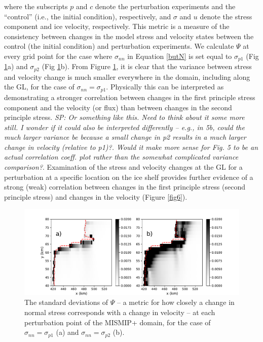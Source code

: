 \documentclass[review,oneside]{igs}
\begin{document}
where the subscripts $p$ and $c$ denote the perturbation experiments and the ``control'' (i.e., the initial condition), respectively, and $\sigma$ and $u$ denote the stress component and ice velocity, respectively. This metric is a measure of the consistency between changes in the model stress and velocity states between the control (the initial condition) and perturbation experiments. We calculate $\Psi$ at every grid point for the case where  $\sigma_{nn}$ in Equation \ref{butN} is set equal to $\sigma_{p1}$ (Fig \ref{fig5}a) and $\sigma_{p2}$ (Fig \ref{fig5}b). From Figure \ref{fig5}, it is clear that the variance between stress and velocity change is much smaller everywhere in the domain, including along the GL, for the case of $\sigma_{nn}=\sigma_{p1}$. Physically this can be interpreted as demonstrating a stronger correlation between changes in the first principle stress component and the velocity (or flux) than between changes in the second principle stress. \textit{SP: Or something like this. Need to think about it some more still. I wonder if it could also be interpreted differently -- e.g., in 5b, could the much larger variance be because a small change in p2 results in a much larger change in velocity (relative to p1)?. Would it make more sense for Fig. 5 to be an actual correlation coeff. plot rather than the somewhat complicated variance comparison?}. Examination of the stress and velocity changes at the GL for a perturbation at a specific location on the ice shelf provides further evidence of a strong (weak) correlation between changes in the first principle stress (second principle stress) and changes in the velocity (Figure \ref{fig6}).   


\begin{figure}
	\centering
    \includegraphics[width=1\linewidth]{figs/fig5.pdf}
    \caption{The standard deviations of $\Psi$ -- a metric for how closely a change in normal stress corresponds with a change in velocity -- at each perturbation point of the MISMIP+ domain, for the case of $\sigma_{nn}=\sigma_{p1}$ (a) and $\sigma_{nn}=\sigma_{p2}$ (b).}
	\label{fig5}
\end{figure}
\end{document}
